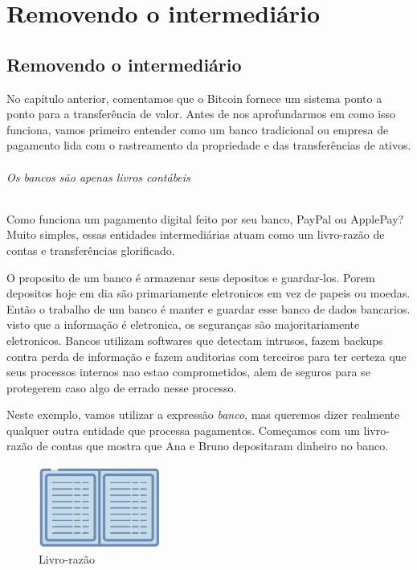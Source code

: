 \part{Removendo o intermediário}
\label{ch:capitulo2}
\chapter*{Removendo o intermediário}

No capítulo anterior, comentamos que o Bitcoin fornece um sistema ponto a ponto para a transferência de valor. Antes de nos aprofundarmos em como isso funciona, vamos primeiro entender como um banco tradicional ou empresa de pagamento lida com o rastreamento da propriedade e das transferências de ativos.

\paragraph{Os bancos são apenas livros contábeis}
\paragraph{}

Como funciona um pagamento digital feito por seu banco, PayPal ou ApplePay? Muito simples, essas entidades intermediárias atuam como um livro-razão de contas e transferências glorificado.

O proposito de um banco é armazenar seus depositos e guardar-los. Porem depositos hoje em dia são primariamente eletronicos em vez de papeis ou moedas.
Então o trabalho de um banco é manter e guardar esse banco de dados bancarios.
visto que a informação é eletronica, os seguranças são majoritariamente eletronicos.
Bancos utilizam softwares que detectam intrusos, fazem backups contra perda de informação e fazem auditorias com terceiros para ter certeza que seus processos internos nao estao comprometidos, alem de seguros para se protegerem caso algo de errado nesse processo.

Neste exemplo, vamos utilizar a expressão \textit{banco}, mas queremos dizer realmente qualquer outra entidade que processa pagamentos. Começamos com um livro-razão de contas que mostra que Ana e Bruno depositaram dinheiro no banco.

\newpage
\begin{figure}
  \centering
  \includegraphics[width=4cm]{imagens/livro-capitulo-02.jpg}  
  \caption{Livro-razão}
\end{figure}

